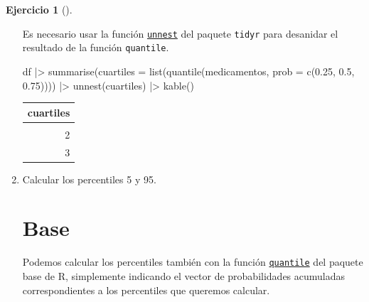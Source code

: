 \documentclass[
  spanish,
  a4paper,
]{scrreport}
\newenvironment{Shaded}{\begin{snugshade}}{\end{snugshade}}
\newcommand{\AttributeTok}[1]{\textcolor[rgb]{0.40,0.45,0.13}{#1}}
\newcommand{\FloatTok}[1]{\textcolor[rgb]{0.68,0.00,0.00}{#1}}
\newcommand{\FunctionTok}[1]{\textcolor[rgb]{0.28,0.35,0.67}{#1}}
\newcommand{\NormalTok}[1]{\textcolor[rgb]{0.00,0.23,0.31}{#1}}
\newcommand{\SpecialCharTok}[1]{\textcolor[rgb]{0.37,0.37,0.37}{#1}}
\theoremstyle{definition}
\newtheorem{exercise}{Ejercicio}[chapter]
\theoremstyle{remark}
\begin{document}
\begin{exercise}[]
\begin{enumerate}
\begin{tcolorbox}
  Es necesario usar la función
  \href{https://tidyr.tidyverse.org/reference/unnest.html}{\texttt{unnest}}
  del paquete \texttt{tidyr} para desanidar el resultado de la función
  \texttt{quantile}.

\begin{Shaded}
\begin{Highlighting}[]
\NormalTok{df }\SpecialCharTok{|\textgreater{}} \FunctionTok{summarise}\NormalTok{(}\AttributeTok{cuartiles =} \FunctionTok{list}\NormalTok{(}\FunctionTok{quantile}\NormalTok{(medicamentos, }\AttributeTok{prob =} \FunctionTok{c}\NormalTok{(}\FloatTok{0.25}\NormalTok{, }\FloatTok{0.5}\NormalTok{, }\FloatTok{0.75}\NormalTok{)))) }\SpecialCharTok{|\textgreater{}}
    \FunctionTok{unnest}\NormalTok{(cuartiles) }\SpecialCharTok{|\textgreater{}} 
    \FunctionTok{kable}\NormalTok{()}
\end{Highlighting}
\end{Shaded}

  \begin{longtable}[]{@{}r@{}}
  \toprule\noalign{}
  cuartiles \\
  \midrule\noalign{}
  \endhead
  \bottomrule\noalign{}
  \endlastfoot
  1 \\
  2 \\
  3 \\
  \end{longtable}

  \end{tcolorbox}
\item
  Calcular los percentiles 5 y 95.

  \begin{tcolorbox}[enhanced jigsaw, colback=white, coltitle=black, toprule=.15mm, rightrule=.15mm, opacitybacktitle=0.6, opacityback=0, bottomtitle=1mm, toptitle=1mm, titlerule=0mm, breakable, leftrule=.75mm, title=\textcolor{quarto-callout-tip-color}{\faLightbulb}\hspace{0.5em}{Solución}, arc=.35mm, left=2mm, bottomrule=.15mm, colframe=quarto-callout-tip-color-frame, colbacktitle=quarto-callout-tip-color!10!white]

  \section{Base}

  Podemos calcular los percentiles también con la función
  \href{https://www.rdocumentation.org/packages/base/versions/3.6.2/topics/quantile}{\texttt{quantile}}
  del paquete base de R, simplemente indicando el vector de
  probabilidades acumuladas correspondientes a los percentiles que
  queremos calcular.


\end{tcolorbox}
\end{enumerate}
\end{exercise}
\end{document}
